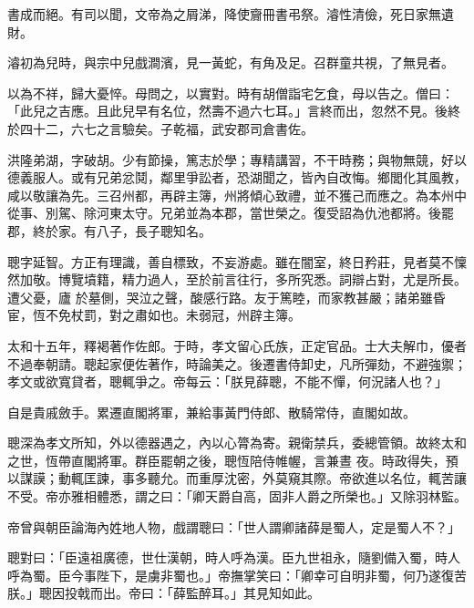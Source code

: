\begin{pinyinscope}
 書成而絕。有司以聞，文帝為之屑涕，降使齎冊書弔祭。濬性清儉，死日家無遺財。



 濬初為兒時，與宗中兒戲澗濱，見一黃蛇，有角及足。召群童共視，了無見者。



 以為不祥，歸大憂悴。母問之，以實對。時有胡僧詣宅乞食，母以告之。僧曰：「此兒之吉應。且此兒早有名位，然壽不過六七耳。」言終而出，忽然不見。後終於四十二，六七之言驗矣。子乾福，武安郡司倉書佐。



 洪隆弟湖，字破胡。少有節操，篤志於學；專精講習，不干時務；與物無競，好以德義服人。或有兄弟忿鬩，鄰里爭訟者，恐湖聞之，皆內自改悔。鄉閭化其風教，咸以敬讓為先。三召州都，再辟主簿，州將傾心致禮，並不獲己而應之。為本州中從事、別駕、除河東太守。兄弟並為本郡，當世榮之。復受詔為仇池都將。後罷郡，終於家。有八子，長子聰知名。



 聰字延智。方正有理識，善自標致，不妄游處。雖在闇室，終日矜莊，見者莫不懍然加敬。博覽墳籍，精力過人，至於前言往行，多所究悉。詞辯占對，尤是所長。遭父憂，廬
 於墓側，哭泣之聲，酸感行路。友于篤睦，而家教甚嚴；諸弟雖昏宦，恆不免杖罰，對之肅如也。未弱冠，州辟主簿。



 太和十五年，釋褐著作佐郎。于時，孝文留心氏族，正定官品。士大夫解巾，優者不過奉朝請。聰起家便佐著作，時論美之。後遷書侍卸史，凡所彈劾，不避強禦；孝文或欲寬貸者，聰輒爭之。帝每云：「朕見薛聰，不能不憚，何況諸人也？」



 自是貴戚斂手。累遷直閣將軍，兼給事黃門侍郎、散騎常侍，直閣如故。



 聰深為孝文所知，外以德器遇之，內以心膂為寄。親衛禁兵，委總管領。故終太和之世，恆帶直閣將軍。群臣罷朝之後，聰恆陪侍帷幄，言兼晝
 夜。時政得失，預以謀謨；動輒匡諫，事多聽允。而重厚沈密，外莫窺其際。帝欲進以名位，輒苦讓不受。帝亦雅相體悉，謂之曰：「卿天爵自高，固非人爵之所榮也。」又除羽林監。



 帝曾與朝臣論海內姓地人物，戲謂聰曰：「世人謂卿諸薛是蜀人，定是蜀人不？」



 聰對曰：「臣遠祖廣德，世仕漢朝，時人呼為漢。臣九世祖永，隨劉備入蜀，時人呼為蜀。臣今事陛下，是虜非蜀也。」帝撫掌笑曰：「卿幸可自明非蜀，何乃遂復苦朕。」聰因投戟而出。帝曰：「薛監醉耳。」其見知如此。




\end{pinyinscope}
